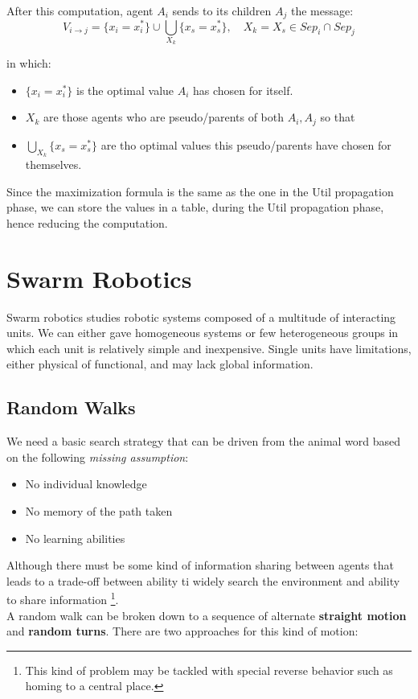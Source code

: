 \documentclass[10pt,a4paper]{article}
\begin{document}
After this computation, agent $A_i$ sends to its children $A_j$ the message:
\[V_{i\rightarrow j}=\lbrace x_i=x_i^*\rbrace\cup \bigcup_{X_k}\lbrace x_s=x_s^*\rbrace,\quad X_k=X_s \in Sep_i \cap Sep_j \]

in which:
\begin{itemize}
\item $\lbrace x_i=x_i^*\rbrace$ is the optimal value $A_i$ has chosen for itself.
\item $X_k$ are those agents who are pseudo/parents of both $A_i,A_j$ so that
\item $\bigcup_{X_k}\lbrace x_s=x_s^*\rbrace$ are tho optimal values this pseudo/parents have chosen for themselves.
\end{itemize}

Since the maximization formula is the same as the one in the Util propagation phase, we can store the values in a table, during the Util propagation phase, hence reducing the computation.

\newpage

\section{Swarm Robotics}
\label{sec:swarm_robotic}
Swarm robotics studies robotic systems composed of a multitude of interacting units. We can either gave homogeneous systems or few heterogeneous groups in which each unit is relatively simple and inexpensive.
Single units have limitations, either physical of functional, and may lack global information.

\subsection{Random Walks}
We need a basic search strategy that can be driven from the animal word based on the following \textit{missing assumption}:
\begin{itemize}
\item No individual knowledge
\item No memory of the path taken
\item No learning abilities 
\end{itemize} 
Although there must be some kind of information sharing between agents that leads to a trade-off between ability ti widely search the environment and ability to share information \footnote{This kind of problem may be tackled with special reverse behavior such as homing to a central place.}.\\
A random walk can be broken down to a sequence of alternate \textbf{straight motion} and \textbf{random turns}. There are two approaches for this kind of motion:
\end{document}
